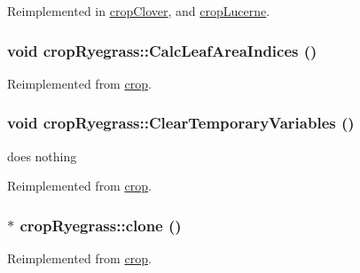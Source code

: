 Reimplemented in \hyperlink{classcrop_clover_ab0d1a2a7eb7738bac0cb6456a95cf90c}{cropClover}, and \hyperlink{classcrop_lucerne_afa12d3c07920dd3947636f3a7da8c4b4}{cropLucerne}.\hypertarget{classcrop_ryegrass_a573d23b1d622e156001cae5c45203bc0}{
\subsubsection[{CalcLeafAreaIndices}]{\setlength{\rightskip}{0pt plus 5cm}void cropRyegrass::CalcLeafAreaIndices ()}}
\label{classcrop_ryegrass_a573d23b1d622e156001cae5c45203bc0}


Reimplemented from \hyperlink{classcrop_a14395e2b72c28aaf9dc729fcd0d3b1c8}{crop}.\hypertarget{classcrop_ryegrass_a8c524dccd76c81476124974e3e486a33}{
\subsubsection[{ClearTemporaryVariables}]{\setlength{\rightskip}{0pt plus 5cm}void cropRyegrass::ClearTemporaryVariables ()}}
\label{classcrop_ryegrass_a8c524dccd76c81476124974e3e486a33}


does nothing 

Reimplemented from \hyperlink{classcrop_ac113e2ac847afe0da1d72cad7faf4c5f}{crop}.\hypertarget{classcrop_ryegrass_af7eb9cc81f755e89fc1486cc242b8b84}{
\subsubsection[{clone}]{ $\ast$ cropRyegrass::clone ()}}
\label{classcrop_ryegrass_af7eb9cc81f755e89fc1486cc242b8b84}


Reimplemented from \hyperlink{classcrop_a59eff636f3b438badd4b06811c1fc595}{crop}.

